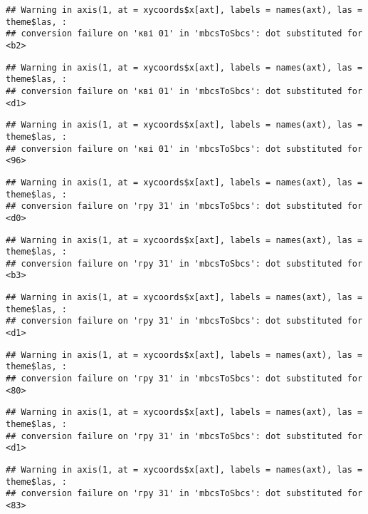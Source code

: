 \documentclass[]{article}
\begin{document}
\begin{verbatim}
## Warning in axis(1, at = xycoords$x[axt], labels = names(axt), las = theme$las, :
## conversion failure on 'кві 01' in 'mbcsToSbcs': dot substituted for <b2>
\end{verbatim}

\begin{verbatim}
## Warning in axis(1, at = xycoords$x[axt], labels = names(axt), las = theme$las, :
## conversion failure on 'кві 01' in 'mbcsToSbcs': dot substituted for <d1>
\end{verbatim}

\begin{verbatim}
## Warning in axis(1, at = xycoords$x[axt], labels = names(axt), las = theme$las, :
## conversion failure on 'кві 01' in 'mbcsToSbcs': dot substituted for <96>
\end{verbatim}

\begin{verbatim}
## Warning in axis(1, at = xycoords$x[axt], labels = names(axt), las = theme$las, :
## conversion failure on 'гру 31' in 'mbcsToSbcs': dot substituted for <d0>
\end{verbatim}

\begin{verbatim}
## Warning in axis(1, at = xycoords$x[axt], labels = names(axt), las = theme$las, :
## conversion failure on 'гру 31' in 'mbcsToSbcs': dot substituted for <b3>
\end{verbatim}

\begin{verbatim}
## Warning in axis(1, at = xycoords$x[axt], labels = names(axt), las = theme$las, :
## conversion failure on 'гру 31' in 'mbcsToSbcs': dot substituted for <d1>
\end{verbatim}

\begin{verbatim}
## Warning in axis(1, at = xycoords$x[axt], labels = names(axt), las = theme$las, :
## conversion failure on 'гру 31' in 'mbcsToSbcs': dot substituted for <80>
\end{verbatim}

\begin{verbatim}
## Warning in axis(1, at = xycoords$x[axt], labels = names(axt), las = theme$las, :
## conversion failure on 'гру 31' in 'mbcsToSbcs': dot substituted for <d1>
\end{verbatim}

\begin{verbatim}
## Warning in axis(1, at = xycoords$x[axt], labels = names(axt), las = theme$las, :
## conversion failure on 'гру 31' in 'mbcsToSbcs': dot substituted for <83>
\end{verbatim}
\end{document}
